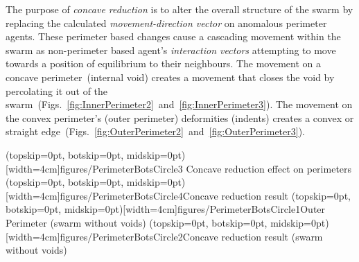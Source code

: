 \documentclass{ieeeaccess}
\begin{document}
The purpose of \textit{concave reduction} is to alter the overall structure of the swarm by replacing the calculated \textit{movement-direction vector} on anomalous perimeter agents. These perimeter based changes cause a cascading movement within the swarm as non-perimeter based agent's \textit{interaction vectors} attempting to move towards a position of equilibrium to their neighbours. The movement on a concave perimeter~(internal void) creates a movement that closes the void by percolating it out of the swarm~(Figs.~\ref{fig:InnerPerimeter2}~and~\ref{fig:InnerPerimeter3}). The movement on the convex perimeter's (outer perimeter) deformities (indents) creates a convex or straight edge~(Figs.~\ref{fig:OuterPerimeter2}~and~\ref{fig:OuterPerimeter3}).

\Figure[t!](topskip=0pt, botskip=0pt, midskip=0pt)[width=4cm]{figures/PerimeterBotsCircle3}
{Concave reduction effect on perimeters\label{fig:InnerPerimeter2}}
\Figure[t!](topskip=0pt, botskip=0pt, midskip=0pt)[width=4cm]{figures/PerimeterBotsCircle4}{Concave reduction result\label{fig:InnerPerimeter3}}
\Figure[t!](topskip=0pt, botskip=0pt, midskip=0pt)[width=4cm]{figures/PerimeterBotsCircle1}{Outer Perimeter (swarm without voids)\label{fig:OuterPerimeter2}}
\Figure[t!](topskip=0pt, botskip=0pt, midskip=0pt)[width=4cm]{figures/PerimeterBotsCircle2}{Concave reduction result (swarm without voids)\label{fig:OuterPerimeter3}}
\end{document}
